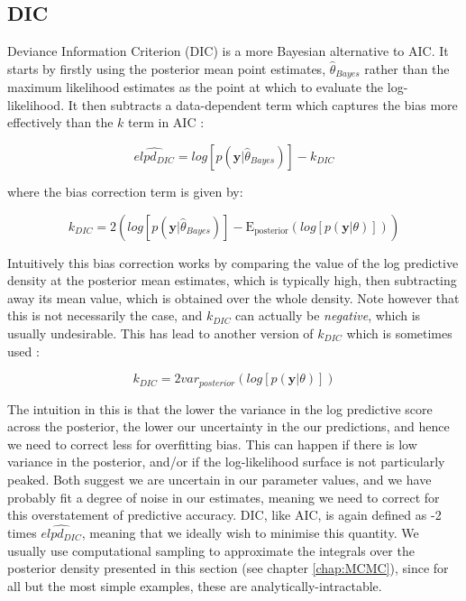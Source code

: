 \documentclass[11pt,fullpage]{book}
\begin{document}
\subsection{DIC}
Deviance Information Criterion (DIC) \cite{spiegelhalter2002bayesian} is a more Bayesian alternative to AIC. It starts by firstly using the posterior mean point estimates, $\hat{\theta}_{Bayes}$ rather than the maximum likelihood estimates as the point at which to evaluate the log-likelihood. It then subtracts a data-dependent term which captures the bias more effectively than the $k$ term in AIC \cite{gelman2013bayesian}:

\begin{equation}\label{eq:Evaluation_DIC}
\widehat{elpd_{DIC}} = log \left[p(\boldsymbol{y}|\hat{\theta}_{Bayes})\right] - k_{DIC}
\end{equation}

where the bias correction term is given by:

\begin{equation}\label{eq:Evaluation_DIC1}
k_{DIC} = 2\left(log\left[ p(\boldsymbol{y}|\hat{\theta}_{Bayes})\right] - \mathrm{E_{posterior}}(log\left[ p(\boldsymbol{y}|\theta)\right])\right)
\end{equation}

Intuitively this bias correction works by comparing the value of the log predictive density at the posterior mean estimates, which is typically high, then subtracting away its mean value, which is obtained over the whole density. Note however that this is not necessarily the case, and $k_{DIC}$ can actually be \textit{negative}, which is usually undesirable. This has lead to another version of $k_{DIC}$ which is sometimes used \cite{gelman2013bayesian}:

\begin{equation}\label{eq:Evaluation_DIC2}
k_{DIC} = 2 var_{posterior}\left(log[p(\boldsymbol{y}|\theta)]\right)
\end{equation}

The intuition in this is that the lower the variance in the log predictive score across the posterior, the lower our uncertainty in the our predictions, and hence we need to correct less for overfitting bias. This can happen if there is low variance in the posterior, and/or if the log-likelihood surface is not particularly peaked. Both suggest we are uncertain in our parameter values, and we have probably fit a degree of noise in our estimates, meaning we need to correct for this overstatement of predictive accuracy. 
DIC, like AIC, is again defined as -2 times $\widehat{elpd_{DIC}}$, meaning that we ideally wish to minimise this quantity. We usually use computational sampling to approximate the integrals over the posterior density presented in this section (see chapter \ref{chap:MCMC}), since for all but the most simple examples, these are analytically-intractable.
\end{document}
